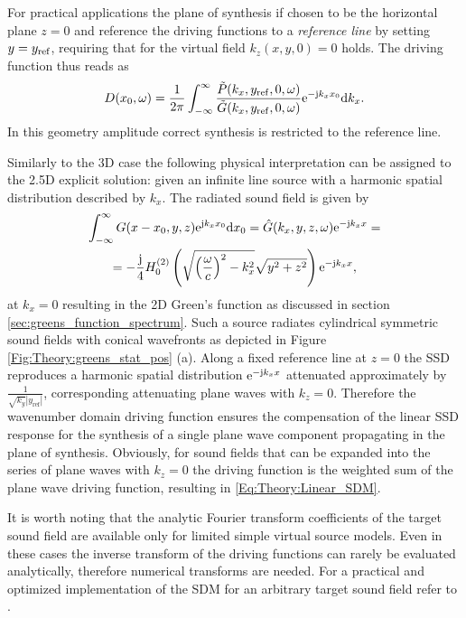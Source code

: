 For practical applications the plane of synthesis if chosen to be the horizontal plane $z=0$ and reference the driving functions to a \emph{reference line} by setting $y = y_{\mathrm{ref}}$, requiring that for the virtual field $k_z(x,y,0) = 0$ holds.
The driving function thus reads as
\begin{equation}
D(x_0,\omega) = \frac{1}{2\pi} \int_{-\infty}^{\infty} \frac{\tilde{P}(k_x,y_{\mathrm{ref}},0, \omega) }{\tilde{G}(k_x,y_{\mathrm{ref}},0, \omega)} \mathrm{e}^{-\mathrm{j} k_x x_0} \mathrm{d} k_x.
\label{Eq:Theory:Linear_SDM}
\end{equation}
In this geometry amplitude correct synthesis is restricted to the reference line.

Similarly to the 3D case the following physical interpretation can be assigned to the 2.5D explicit solution:
given an infinite line source with a harmonic spatial distribution described by $k_x$. 
The radiated sound field is given by
\begin{multline}
\int_{-\infty}^{\infty} G(x - x_0,y,z) \mathrm{e}^{\mathrm{j} k_x x_0} \mathrm{d} x_0 = \hat{G}(k_x,y,z,\omega) \mathrm{e}^{-\mathrm{j} k_x x} = \\
=  -\frac{\mathrm{j}}{4} H_0^{(2)}\left( \sqrt{\left( \frac{\omega}{c} \right)^2-k_x^2} \sqrt{y^2+z^2} \right)  \mathrm{e}^{-\mathrm{j} k_x x},
\end{multline}
at $k_x=0$ resulting in the 2D Green's function as discussed in section \ref{sec:greens_function_spectrum}.
Such a source radiates cylindrical symmetric sound fields with conical wavefronts as depicted in Figure \eqref{Fig:Theory:greens_stat_pos} (a). 
Along a fixed reference line at $z=0$ the SSD reproduces a harmonic spatial distribution $\mathrm{e}^{-\mathrm{j} k_x x}$ attenuated approximately by $\frac{1}{\sqrt{k_y}|y_{\mathrm{ref}}|}$, corresponding attenuating plane waves with $k_z=0$.
Therefore the wavenumber domain driving function ensures the compensation of the linear SSD response for the synthesis of a single plane wave component propagating in the plane of synthesis.
Obviously, for sound fields that can be expanded into the series of plane waves with $k_z=0$ the driving function is the weighted sum of the plane wave driving function, resulting in \ref{Eq:Theory:Linear_SDM}.

It is worth noting that the analytic Fourier transform coefficients of the target sound field are available only for limited simple virtual source models. 
Even in these cases the inverse transform of the driving functions can rarely be evaluated analytically, therefore numerical transforms are needed.
For a practical and optimized implementation of the SDM for an arbitrary target sound field refer to \cite{ahrens2013a:efficientSDM}.

